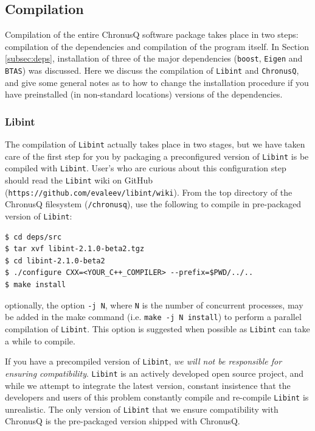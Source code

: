 \documentclass[12pt]{article}
\begin{document}
\subsection{Compilation}
Compilation of the entire ChronusQ software package takes place in two steps: compilation of the dependencies and compilation of the program itself. In Section \ref{subsec:deps}, installation of three of the major dependencies (\texttt{boost}, \texttt{Eigen} and \texttt{BTAS}) was discussed. Here we discuss the compilation of \texttt{Libint} and \texttt{ChronusQ}, and give some general notes as to how to change the installation procedure if you have preinstalled (in non-standard locations) versions of the dependencies.

\subsubsection{Libint} \label{subsubsec:libintcomp}
The compilation of \texttt{Libint} actually takes place in two stages, but we have taken care of the first step for you by packaging a preconfigured version of \texttt{Libint} is be compiled with \texttt{Libint}. User's who are curious about this configuration step should read the \texttt{Libint} wiki on GitHub (\texttt{https://github.com/evaleev/libint/wiki}). From the top directory of the ChronusQ filesystem (\texttt{/chronusq}), use the following to compile in pre-packaged version of \texttt{Libint}:
\begin{lstlisting}
$ cd deps/src
$ tar xvf libint-2.1.0-beta2.tgz
$ cd libint-2.1.0-beta2
$ ./configure CXX=<YOUR_C++_COMPILER> --prefix=$PWD/../..
$ make install
\end{lstlisting}
optionally, the option \texttt{-j N}, where \texttt{N} is the number of concurrent processes, may be added in the make command (i.e. \texttt{make -j N install}) to perform a parallel compilation of \texttt{Libint}. This option is suggested when possible as \texttt{Libint} can take a while to compile.

If you have a precompiled version of \texttt{Libint}, \emph{we will not be responsible for ensuring compatibility}. \texttt{Libint} is an actively developed open source project, and while we attempt to integrate the latest version, constant insistence that the developers and users of this problem constantly compile and re-compile \texttt{Libint} is unrealistic. The only version of \texttt{Libint} that we ensure compatibility with ChronusQ is the pre-packaged version shipped with ChronusQ. 
\end{document}

